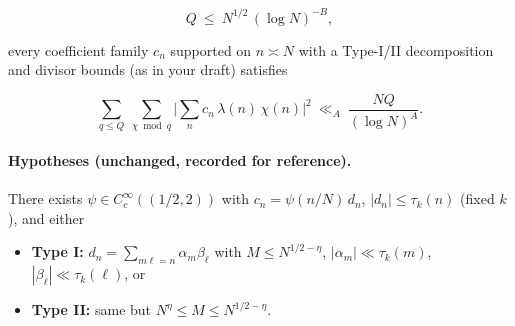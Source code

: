 \documentclass[11pt]{article}
\theoremstyle{definition}
\theoremstyle{remark}
\begin{document}
$$
	Q\ \le\ N^{1/2}\,(\log N)^{-B},
$$

every coefficient family $c_n$ supported on $n\asymp N$ with a Type-I/II decomposition and divisor bounds (as in your draft) satisfies

$$
	\sum_{q\le Q}\ \sum_{\chi\bmod q}
	\Bigg|\sum_{n} c_n\,\lambda(n)\,\chi(n)\Bigg|^2
	\ \ll_{A}\ \frac{NQ}{(\log N)^A}.
$$

\paragraph{Hypotheses (unchanged, recorded for reference).}
There exists $\psi\in C_c^\infty((1/2,2))$ with $c_n=\psi(n/N)\,d_n$, $|d_n|\le \tau_k(n)$ (fixed $k$), and either

\begin{itemize}
	\item \textbf{Type I:} $d_n=\sum_{m\ell=n}\alpha_m\beta_\ell$ with $M\le N^{1/2-\eta}$, $|\alpha_m|\ll \tau_k(m)$, $|\beta_\ell|\ll \tau_k(\ell)$, or
	\item \textbf{Type II:} same but $N^{\eta}\le M\le N^{1/2-\eta}$.
\end{itemize}
\end{document}
